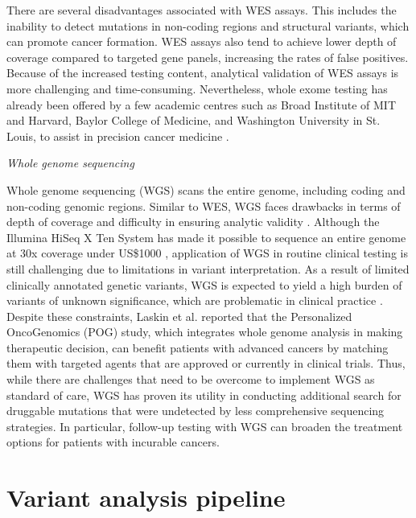 There are several disadvantages associated with WES assays. This includes the inability to detect mutations in non-coding regions and structural variants, which can promote cancer formation. WES assays also tend to achieve lower depth of coverage compared to targeted gene panels, increasing the rates of false positives. Because of the increased testing content, analytical validation of WES assays is more challenging and time-consuming. Nevertheless, whole exome testing has already been offered by a few academic centres such as Broad Institute of \acs{MIT} and Harvard, Baylor College of Medicine, and Washington University in St. Louis, to assist in precision cancer medicine \cite{Simon2013, Rabbani2014}.

\vspace{5mm}
\noindent\textit{Whole genome sequencing}

Whole genome sequencing (\acs{WGS}) scans the entire genome, including coding and non-coding genomic regions. Similar to WES, WGS faces drawbacks in terms of depth of coverage and difficulty in ensuring analytic validity \cite{Simon2013}. Although the Illumina HiSeq X Ten System has made it possible to sequence an entire genome at 30x coverage under US\$1000 \cite{Dong2015}, application of WGS in routine clinical testing is still challenging due to limitations in variant interpretation. As a result of limited clinically annotated genetic variants, WGS is expected to yield a high burden of variants of unknown significance, which are problematic in clinical practice \cite{Rehm2013, Simon2013}. Despite these constraints, Laskin et al. \cite{Laskin2015} reported that the Personalized OncoGenomics (POG) study, which integrates whole genome analysis in making therapeutic decision, can benefit patients with advanced cancers by matching them with targeted agents that are approved or currently in clinical trials. Thus, while there are challenges that need to be overcome to implement WGS as standard of care, WGS has proven its utility in conducting additional search for druggable mutations that were undetected by less comprehensive sequencing strategies. In particular, follow-up testing with WGS can broaden the treatment options for patients with incurable cancers.

\section{Variant analysis pipeline}
\label{sec:Variantanalysispipeline}


